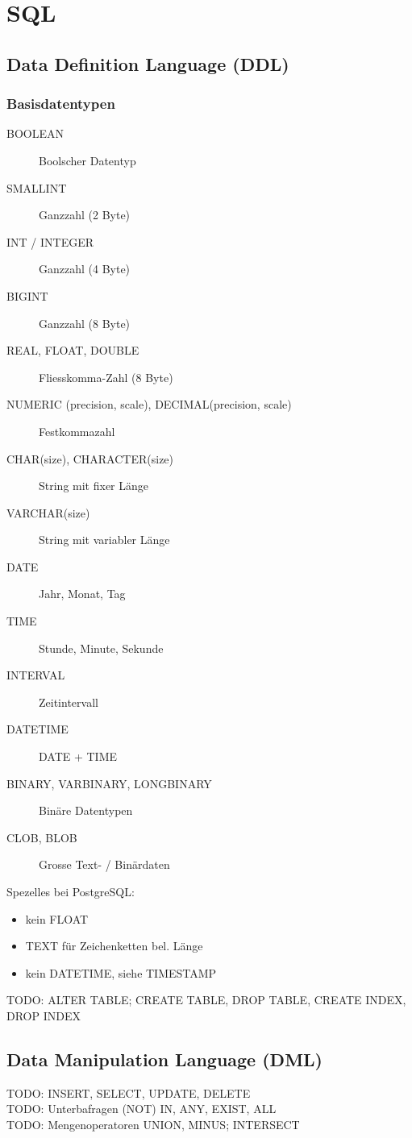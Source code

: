 \section{SQL}
\subsection{Data Definition Language (DDL)}
\subsubsection{Basisdatentypen}
\begin{description}
    \item[BOOLEAN] Boolscher Datentyp
    \item[SMALLINT] Ganzzahl (2 Byte)
    \item[INT / INTEGER] Ganzzahl (4 Byte)
    \item[BIGINT] Ganzzahl (8 Byte)
    \item[REAL, FLOAT, DOUBLE] Fliesskomma-Zahl (8 Byte)
    \item[NUMERIC (precision, scale), DECIMAL(precision, scale)] Festkommazahl
    \item[CHAR(size), CHARACTER(size)] String mit fixer Länge
    \item[VARCHAR(size)] String mit variabler Länge
    \item[DATE] Jahr, Monat, Tag
    \item[TIME] Stunde, Minute, Sekunde
    \item[INTERVAL] Zeitintervall
    \item[DATETIME] DATE + TIME
    \item[BINARY, VARBINARY, LONGBINARY] Binäre Datentypen
    \item[CLOB, BLOB] Grosse Text- / Binärdaten
\end{description}
Spezelles bei PostgreSQL:
\begin{itemize}
  \item kein FLOAT
  \item TEXT für Zeichenketten bel. Länge
  \item kein DATETIME, siehe TIMESTAMP
\end{itemize}

TODO: ALTER TABLE; CREATE TABLE, DROP TABLE, CREATE INDEX, DROP INDEX \\

\subsection{Data Manipulation Language (DML)}

TODO: INSERT, SELECT, UPDATE, DELETE \\
TODO: Unterbafragen (NOT) IN, ANY, EXIST, ALL \\
TODO: Mengenoperatoren UNION, MINUS; INTERSECT \\